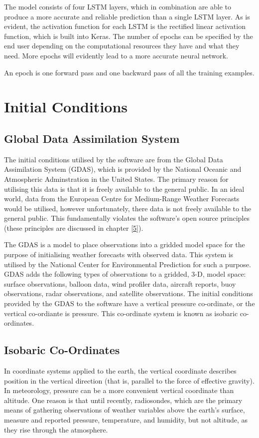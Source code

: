 The model consists of four LSTM layers, which in combination are able to produce a more accurate and reliable prediction than a single LSTM layer. As is evident, the activation function for each LSTM is the rectified linear activation function, which is built into Keras. The number of epochs can be specified by the end user depending on the computational resources they have and what they need. More epochs will evidently lead to a more accurate neural network.

\begin{definition}
An epoch is one forward pass and one backward pass of all the training examples.
\end{definition}

\section{Initial Conditions}\label{noaa_initial_conditions}
\subsection{Global Data Assimilation System}
The initial conditions utilised by the software are from the Global Data Assimilation System (GDAS), which is provided by the National Oceanic and Atmospheric Adminstration in the United States. The primary reason for utilising this data is that it is freely available to the general public. In an ideal world, data from the European Centre for Medium-Range Weather Forecasts would be utilised, however unfortunately, there data is not freely available to the general public. This fundamentally violates the software's open source principles (these principles are discussed in chapter \ref{5}).

The GDAS is a model to place observations into a gridded model space for the purpose of initialising weather forecasts with observed data. This system is utilised by the National Center for Environmental Prediction for such a purpose. GDAS adds the following types of observations to a gridded, 3-D, model space: surface observations, balloon data, wind profiler data, aircraft reports, buoy observations, radar observations, and satellite observations\cite{gdas}. The initial conditions provided by the GDAS to the software have a vertical pressure co-ordinate, or the vertical co-ordiante is pressure. This co-ordinate system is known as isobaric co-ordinates.

\subsection{Isobaric Co-Ordinates}
In coordinate systems applied to the earth, the vertical coordinate describes position in the vertical direction (that is, parallel to the force of effective gravity). In meteorology, pressure can be a more convenient vertical coordinate than altitude. One reason is that until recently, radiosondes, which are the primary means of gathering observations of weather variables above the earth’s surface, measure and reported pressure, temperature, and humidity, but not altitude, as they rise through the atmosphere\cite{isobar_i}.

